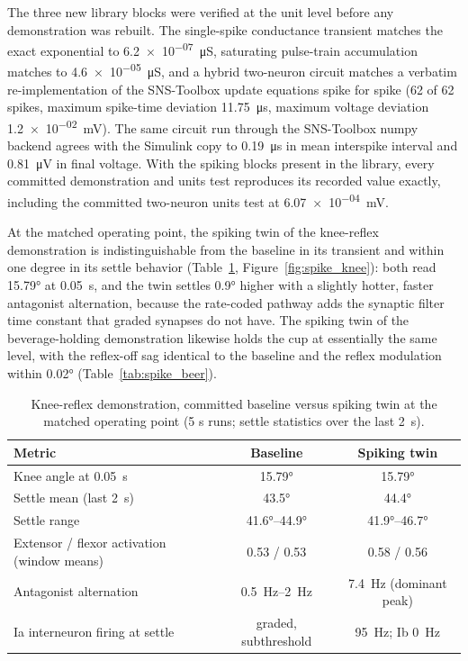 The three new library blocks were verified at the unit level before any demonstration was rebuilt. The single-spike conductance transient matches the exact exponential to \qty{6.2e-07}{\micro\siemens}, saturating pulse-train accumulation matches to \qty{4.6e-05}{\micro\siemens}, and a hybrid two-neuron circuit matches a verbatim re-implementation of the SNS-Toolbox update equations spike for spike (62 of 62 spikes, maximum spike-time deviation \qty{11.75}{\micro\second}, maximum voltage deviation \qty{1.2e-02}{\mV}). The same circuit run through the SNS-Toolbox numpy backend agrees with the Simulink copy to \qty{0.19}{\micro\second} in mean interspike interval and \qty{0.81}{\micro\volt} in final voltage. With the spiking blocks present in the library, every committed demonstration and units test reproduces its recorded value exactly, including the committed two-neuron units test at \qty{6.07e-04}{\mV}.

At the matched operating point, the spiking twin of the knee-reflex demonstration is indistinguishable from the baseline in its transient and within one degree in its settle behavior (Table~\ref{tab:spike_knee}, Figure~\ref{fig:spike_knee}): both read \ang{15.79} at \qty{0.05}{\second}, and the twin settles \ang{0.9} higher with a slightly hotter, faster antagonist alternation, because the rate-coded pathway adds the synaptic filter time constant that graded synapses do not have. The spiking twin of the beverage-holding demonstration likewise holds the cup at essentially the same level, with the reflex-off sag identical to the baseline and the reflex modulation within \ang{0.02} (Table~\ref{tab:spike_beer}).

\begin{table}[htbp]
\caption{Knee-reflex demonstration, committed baseline versus spiking twin at the matched operating point (5 s runs; settle statistics over the last \qty{2}{\second}).}
\label{tab:spike_knee}
\begin{tabular}{@{}lcc@{}}
\toprule
\textbf{Metric} & \textbf{Baseline} & \textbf{Spiking twin} \\
\midrule
Knee angle at \qty{0.05}{\second}   & \ang{15.79} & \ang{15.79} \\
Settle mean (last \qty{2}{\second}) & \ang{43.5}  & \ang{44.4} \\
Settle range                        & \ang{41.6}--\ang{44.9} & \ang{41.9}--\ang{46.7} \\
Extensor / flexor activation (window means) & 0.53 / 0.53 & 0.58 / 0.56 \\
Antagonist alternation              & \qty{0.5}{\hertz}--\qty{2}{\hertz} & \qty{7.4}{\hertz} (dominant peak) \\
Ia interneuron firing at settle     & graded, subthreshold & \qty{95}{\hertz}; Ib \qty{0}{\hertz} \\
\bottomrule
\end{tabular}
\end{table}

